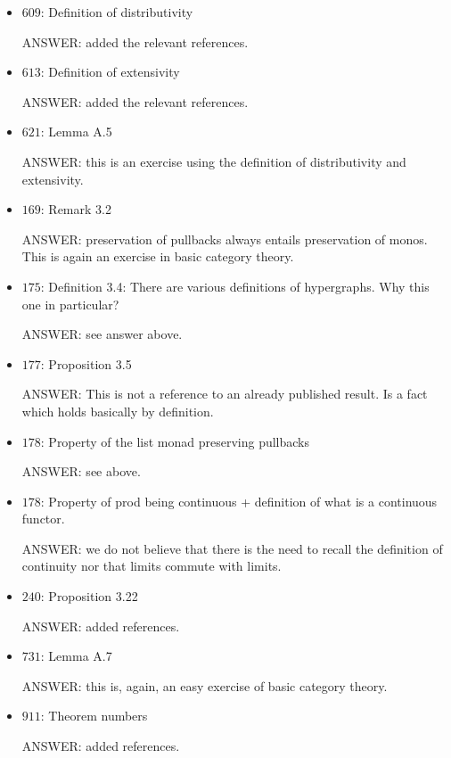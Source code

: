 \documentclass[english,11pt,a4paper]{article}
\begin{document}
\begin{itemize}
	\item $609$: Definition of distributivity
	
	ANSWER: added the relevant references.
	
	\item $613$: Definition of extensivity
	
	ANSWER: added the relevant references.
	
	\item $621$: Lemma A.5
	
	ANSWER: this is an exercise using the definition of distributivity and extensivity.
	
\item 	$169$: Remark 3.2

ANSWER: preservation of pullbacks always entails preservation of monos. This is again an exercise in basic category theory.
	
	\item $175$: Definition 3.4: There are various definitions of hypergraphs. Why this one in particular?
	
	ANSWER: see answer above.


	\item $177$: Proposition 3.5
	
	ANSWER: This is not a reference to an already published result. Is a fact which holds basically by definition.

\item $178$: Property of the list monad preserving pullbacks

ANSWER: see above.

	\item $178$: Property of prod being continuous + definition of what is a continuous functor.
	
ANSWER: we do not believe that there is the need to recall the definition of continuity nor that limits commute with limits.	
	
	
	\item $240$: Proposition 3.22
	
	ANSWER: added references.
	
\item 	$731$: Lemma A.7
	
	ANSWER: this is, again, an easy exercise of basic category theory.
	
	
\item $	911$: Theorem numbers
	
	ANSWER: added references.
	
	
\end{itemize}
\end{document}
